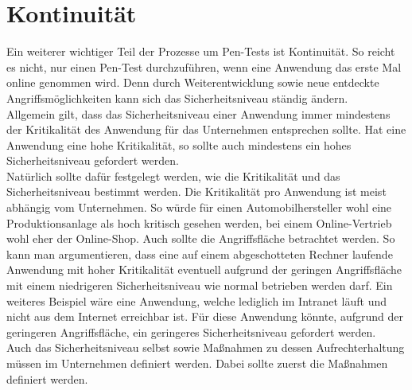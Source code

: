\newpage
\section{Kontinuität}
Ein weiterer wichtiger Teil der Prozesse um Pen-Tests ist Kontinuität. So reicht es nicht, nur einen Pen-Test durchzuführen, wenn eine Anwendung das erste Mal online genommen wird. Denn durch Weiterentwicklung sowie neue entdeckte Angriffsmöglichkeiten kann sich das Sicherheitsniveau ständig ändern.\\

Allgemein gilt, dass das Sicherheitsniveau einer Anwendung immer mindestens der Kritikalität des Anwendung für das Unternehmen entsprechen sollte. Hat eine Anwendung eine hohe Kritikalität, so sollte auch mindestens ein hohes Sicherheitsniveau gefordert werden.\\

Natürlich sollte dafür festgelegt werden, wie die Kritikalität und das Sicherheitsniveau bestimmt werden. Die Kritikalität pro Anwendung ist meist abhängig vom Unternehmen. So würde für einen Automobilhersteller wohl eine Produktionsanlage als hoch kritisch gesehen werden, bei einem Online-Vertrieb wohl eher der Online-Shop. Auch sollte die Angriffsfläche betrachtet werden. So kann man argumentieren, dass eine auf einem abgeschotteten Rechner laufende Anwendung mit hoher Kritikalität eventuell aufgrund der geringen Angriffsfläche mit einem niedrigeren Sicherheitsniveau wie normal betrieben werden darf. Ein weiteres Beispiel wäre eine Anwendung, welche lediglich im Intranet läuft und nicht aus dem Internet erreichbar ist. Für diese Anwendung könnte, aufgrund der geringeren Angriffsfläche, ein geringeres Sicherheitsniveau gefordert werden.\\

Auch das Sicherheitsniveau selbst sowie Maßnahmen zu dessen Aufrechterhaltung müssen im Unternehmen definiert werden. Dabei sollte zuerst die Maßnahmen definiert werden.

